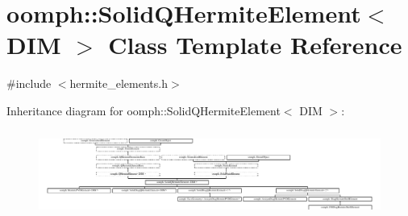 \hypertarget{classoomph_1_1SolidQHermiteElement}{}\section{oomph\+:\+:Solid\+Q\+Hermite\+Element$<$ D\+IM $>$ Class Template Reference}
\label{classoomph_1_1SolidQHermiteElement}


{\ttfamily \#include $<$hermite\+\_\+elements.\+h$>$}

Inheritance diagram for oomph\+:\+:Solid\+Q\+Hermite\+Element$<$ D\+IM $>$\+:\begin{figure}[H]
\begin{center}
\leavevmode
\includegraphics[height=2.888252cm]{classoomph_1_1SolidQHermiteElement}
\end{center}
\end{figure}
